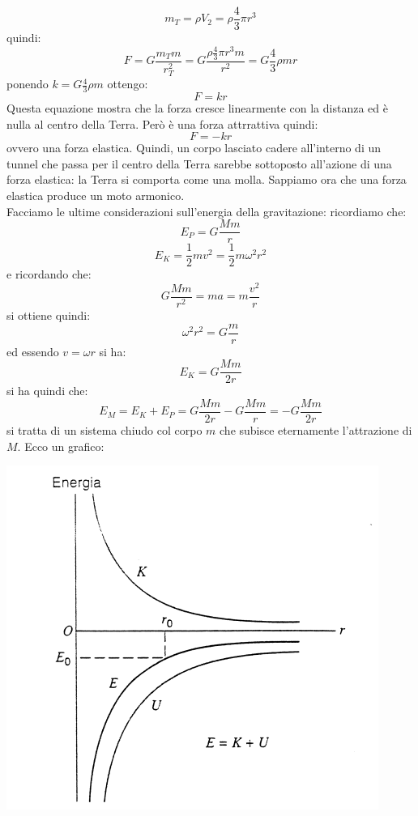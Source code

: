 \documentclass[a4paper,12pt, oneside]{book}
\begin{document}
$$m_T=\rho V_2=\rho\frac{4}{3}\pi r^3$$
quindi:
$$F=G\frac{m_Tm}{r_T^2}=G\frac{\rho\frac{4}{3}\pi r^3 m}{r^2}=G\frac{4}{3}\rho m r$$
ponendo $k=G\frac{4}{3}\rho m $ ottengo:
$$F=kr$$
Questa equazione mostra che la forza  cresce linearmente con la distanza ed è nulla al centro della Terra. Però è una forza attrrattiva quindi:
$$F=-kr$$
ovvero una forza elastica. Quindi, un corpo lasciato cadere all'interno di un tunnel che passa  per il centro della Terra sarebbe sottoposto all'azione di una forza  elastica: la Terra si comporta come una molla. Sappiamo ora che una  forza elastica produce un moto armonico.\\
Facciamo le ultime considerazioni sull'energia della gravitazione:
ricordiamo che:
$$E_P=G\frac{Mm}{r}$$
$$E_K=\frac{1}{2}mv^2=\frac{1}{2}m\omega^2r^2$$
e ricordando che:
$$G\frac{Mm}{r^2}=ma=m\frac{v^2}{r}$$
si ottiene quindi:
$$\omega^2r^2=G\frac{m}{r}$$
ed essendo $v=\omega r$ si ha:
$$E_K=G\frac{Mm}{2r}$$
si ha quindi che:
$$E_M=E_K+E_P=G\frac{Mm}{2r}-G\frac{Mm}{r}=-G\frac{Mm}{2r}$$
si tratta di un sistema chiudo col corpo $m$ che subisce eternamente l'attrazione di $M$. Ecco un grafico:
\begin{center}
	\includegraphics[scale=0.5]{img/grav.png}
\end{center}
\end{document}
